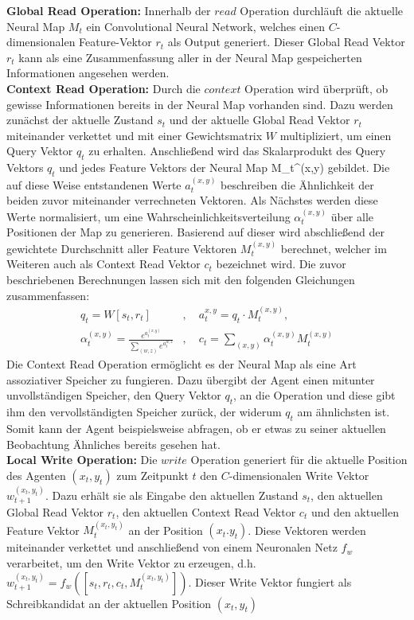 \textbf{Global Read Operation:} Innerhalb der $read$ Operation durchläuft die aktuelle Neural Map $M_t$ ein Convolutional Neural Network, welches einen $C$-dimensionalen Feature-Vektor $r_t$ als Output generiert. Dieser Global Read Vektor $r_t$ kann als eine Zusammenfassung aller in der Neural Map gespeicherten Informationen angesehen werden. \\[0.1in]
\textbf{Context Read Operation:} Durch die $context$ Operation wird überprüft, ob gewisse Informationen bereits in der Neural Map vorhanden sind. Dazu werden zunächst der aktuelle Zustand $s_t$ und der aktuelle Global Read Vektor $r_t$ miteinander verkettet und mit einer Gewichtsmatrix $W$ multipliziert, um einen Query Vektor $q_t$ zu erhalten. Anschließend wird das Skalarprodukt des Query Vektors $q_t$ und jedes Feature Vektors der Neural Map M_t^{(x,y)} gebildet. Die auf diese Weise entstandenen Werte $a_t^{(x,y)}$ beschreiben die Ähnlichkeit der beiden zuvor miteinander verrechneten Vektoren. Als Nächstes werden diese Werte normalisiert, um eine Wahrscheinlichkeitsverteilung $\alpha_t^{(x,y)}$ über alle Positionen der Map zu generieren. Basierend auf dieser wird abschließend der gewichtete Durchschnitt aller Feature Vektoren $M_t^{(x,y)}$ berechnet, welcher im Weiteren auch als Context Read Vektor $c_t$ bezeichnet wird. Die zuvor beschriebenen Berechnungen lassen sich mit den folgenden Gleichungen zusammenfassen:
\begin{equation*}
  \begin{align*}
    q_t = W [s_t, r_t]&, \quad a_t^{x,y} = q_t \cdot M_t^{(x,y)}, \\
    \alpha_t^{(x,y)} = \frac{e^{a_t^{(x,y)}}}{\sum_{(w,z)} e^{a_t^{w,z}}}&, \quad c_t = \sum_{(x,y)} \alpha_t^{(x,y)} M_t^{(x,y)}
  \end{align*}
\end{equation*}
Die Context Read Operation ermöglicht es der Neural Map als eine Art assoziativer Speicher zu fungieren. Dazu übergibt der Agent einen mitunter unvollständigen Speicher, den Query Vektor $q_t$, an die Operation und diese gibt ihm den vervollständigten Speicher zurück, der widerum $q_t$ am ähnlichsten ist. Somit kann der Agent beispielsweise abfragen, ob er etwas zu seiner aktuellen Beobachtung Ähnliches bereits gesehen hat. \\[0.1in]
\textbf{Local Write Operation:} Die $write$ Operation generiert für die aktuelle Position des Agenten $(x_t,y_t)$ zum Zeitpunkt $t$ den $C$-dimensionalen Write Vektor $w_{t+1}^{(x_t,y_t)}$. Dazu erhält sie als Eingabe den aktuellen Zustand $s_t$, den aktuellen Global Read Vektor $r_t$, den aktuellen Context Read Vektor $c_t$ und den aktuellen Feature Vektor $M_t^{(x_t,y_t)}$ an der Position $(x_t.y_t)$. Diese Vektoren werden miteinander verkettet und anschließend von einem Neuronalen Netz $f_w$ verarbeitet, um den Write Vektor zu erzeugen, d.h. $w_{t+1}^{(x_t,y_t)} = f_w([s_t, r_t, c_t, M_t^{(x_t,y_t)}])$. Dieser Write Vektor fungiert als Schreibkandidat an der aktuellen Position $(x_t, y_t)$ \\[0.1in]

